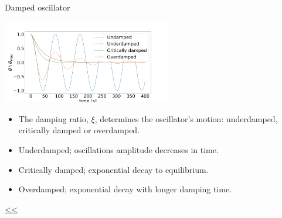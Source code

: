 \documentclass{beamer}
\begin{document}
\begin{frame}{\hypertarget{frame:Damped oscillator}{Damped oscillator}}

	\begin{center}		
		\includegraphics[width=0.55\textwidth,keepaspectratio]{damp.png}
    \end{center}
	\begin{itemize}	
		\item The damping ratio, $\xi$, determines the oscillator's motion: underdamped, critically damped or overdamped.
		\item Underdamped; oscillations amplitude decreases in time.
		\item Critically damped; exponential decay to equilibrium.
		\item Overdamped; exponential decay with longer damping time. 		
	\end{itemize}
	\hyperlink{frame:Harmonic oscillator}{<<} 
\end{frame}
\end{document}
